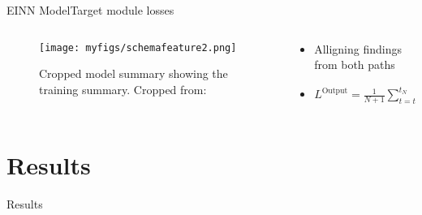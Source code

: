 \documentclass[
	aspectratio=169,	%
	onlytextwidth,		%
	t,					%
	]{beamer}
\begin{document}
\begin{frame}[fragile]{EINN Model}{Target module losses}
	\begin{columns}
		
		\begin{column}[T]{.5\textwidth}
			\begin{figure}
				\texttt{[image: myfigs/schemafeature2.png]}
				\caption{Cropped model summary showing the training summary. Cropped from:~\cite{main}}
			\end{figure}
		\end{column}
		
		\begin{column}[T]{.5\textwidth}
			\begin{itemize}
				\item<1-> Alligning findings from both paths
				\item<2-> $L^{\text{Output}} = \frac{1}{N+1}\sum_{t=t_{0}}^{t_{N}} \left[ s_{t} - s_{t}^{F} \right]^{2}$
			\end{itemize}
		\end{column}
			
\end{columns}
\end{frame}


\section{Results}

\begin{frame}[fragile]{Results}


\end{frame}

\appendix

\makebibliography

\makethankyou
\end{document}
